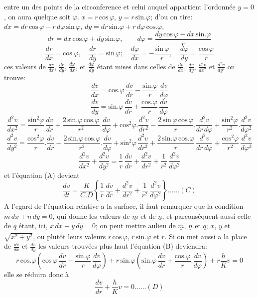 \documentclass[11pt,a4paper]{article}
\begin{document}
entre un des points de la circonference et celui auquel appartient
l'ordonnée $y = 0$, on aura quelque soit $\varphi$. $x = r\,\text{cos}\,\varphi$, $y = r\,\text{sin}.\varphi$;
d'ou on tire: $dx = dr\,\text{cos}\,\varphi - r\,d\varphi\,\text{sin}\,\varphi$, $dy = dr\,\text{sin}.\varphi + r\,d\varphi\,\text{cos}.\varphi$,
\[ dr = dx\,\text{cos}.\varphi + dy\,\text{sin}.\varphi, \qquad d\varphi = \frac{dy\,\text{cos}\,\varphi - dx\,\text{sin}.\varphi}{r} \]
\[ \frac{dr}{dx} = \text{cos}.\varphi, \quad \frac{dr}{dy} = \text{sin}\,\varphi; \quad \frac{d\varphi}{dx} = -\frac{\text{sin}\,\varphi}{r}, \quad \frac{d\varphi}{dy} = \frac{\text{cos}\,\varphi}{r} \]
ces valeurs de $\frac{dr}{dx}$, $\frac{dr}{dy}$, $\frac{d\varphi}{dx}$, et $\frac{d\varphi}{dy}$ étant mises dans celles de
$\frac{dv}{dx}$, $\frac{dv}{dy}$, $\frac{d^2v}{dx^2}$ et $\frac{d^2v}{dy^2}$ on trouve:
\[ \frac{dv}{dx} = \text{cos}.\varphi\,\frac{dv}{dr} - \frac{\text{sin}.\varphi}{r}\,\frac{dv}{d\varphi} \]
\[ \frac{dv}{dy} = \text{sin}.\varphi\,\frac{dv}{dr} + \frac{\text{cos}.\varphi}{r}\,\frac{dv}{d\varphi} \]
\[ \frac{d^2v}{dx^2} = \frac{\text{sin}^2\varphi}{r}\,\frac{dv}{dr} + \frac{2\,\text{sin}.\varphi\,\text{cos}.\varphi}{r^2}.\frac{dv}{d\varphi} + \text{cos}^2\varphi.\frac{d^2v}{dr^2} - \frac{2\,\text{sin}\,\varphi\,\text{cos}\,\varphi}{r}.\frac{d^2v}{dr\,d\varphi} + \frac{\text{sin}^2\varphi}{r^2}.\frac{d^2v}{d\varphi^2} \]
\[ \frac{d^2v}{dy^2} = \frac{\text{cos}^2\varphi}{r}.\frac{dv}{dr} - \frac{2\,\text{sin}.\varphi\,\text{cos}.\varphi}{r^2}.\frac{dv}{d\varphi} + \text{sin}^2\varphi\,\frac{d^2v}{dr^2} + \frac{2\,\text{sin}.\varphi\,\text{cos}.\varphi}{r}\,\frac{d^2v}{dr\,d\varphi} + \frac{\text{cos}^2\varphi}{r^2}\,\frac{d^2v}{d\varphi^2} \]
\[ \frac{d^2v}{dx^2} + \frac{d^2v}{dy^2} = \frac{1}{r}\,\frac{dv}{dr} + \frac{d^2v}{dr^2} + \frac{1}{r^2}\,\frac{d^2v}{d\varphi^2} \]
et l'équation (A) devient
\[ \frac{dv}{dt} = \frac{K}{C.D}\left\{\frac{1}{r}\,\frac{dv}{dr} + \frac{d^2v}{dr^2} + \frac{1}{r^2}\,\frac{d^2v}{d\varphi^2}\right\} \ldots\ldots (C) \]
A l'egard de l'équation relative a la surface, il faut remarquer
que la condition $m\,dx + n\,dy = 0$, qui donne les valeurs de $\underline{m}$ et de $\underline{n}$,
et parconséquent aussi celle de $\underline{q}$ étant, ici, $x\,dx + y\,dy = 0$; on
peut mettre aulieu de $\underline{m}$, $\underline{n}$ et $q$; $x$, $y$ et $\sqrt{x^2+y^2}$, ou plutôt leurs valeurs
$r\,\text{cos}\,\varphi$, $r\,\text{sin}.\varphi$ et $r$. Si on met aussi a la place de $\frac{dv}{dx}$ et $\frac{dv}{dy}$
les valeurs trouvées plus haut l'équation (B) deviendra:
\[ r\,\text{cos}.\varphi\left(\text{cos}\,\varphi\,\frac{dv}{dr} - \frac{\text{sin}.\varphi}{r}\,\frac{dv}{d\varphi}\right) + r\,\text{sin}.\varphi\left(\text{sin}.\varphi\,\frac{dv}{dr} + \frac{\text{cos}.\varphi}{r}.\frac{dv}{d\varphi}\right) + r\frac{h}{K}v = 0 \]
elle se réduira donc à
\[ \frac{dv}{dr} + \frac{h}{K}v = 0 \ldots\ldots (D) \]
\end{document}
